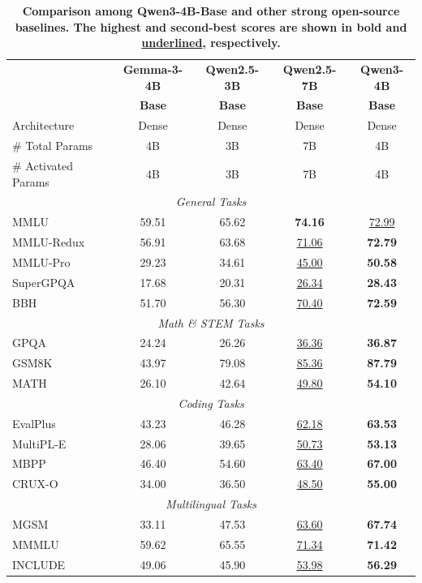 \begin{table}[tbp]
\centering
\caption{\textbf{Comparison among Qwen3-4B-Base and other strong open-source baselines. The highest and second-best scores are shown in \textbf{bold} and \underline{underlined}, respectively.}}
\label{tab:base-4B}
\small %
\begin{tabular}{@{}lcccc@{}}
\toprule
 & \textbf{Gemma-3-4B} & \textbf{Qwen2.5-3B} & \textbf{Qwen2.5-7B} & \textbf{Qwen3-4B} \\
 & \textbf{Base} & \textbf{Base}& \textbf{Base}& \textbf{Base} \\
\midrule
Architecture & Dense & Dense & Dense & Dense\\
\# Total Params & 4B & 3B & 7B & 4B \\
\# Activated Params & 4B & 3B & 7B & 4B \\
\midrule
\multicolumn{5}{c}{\textit{General Tasks}} \\
\midrule
MMLU & 59.51 & 65.62 & \textbf{74.16} & \underline{72.99} \\
MMLU-Redux & 56.91 & 63.68 & \underline{71.06} & \textbf{72.79} \\
MMLU-Pro & 29.23 & 34.61 & \underline{45.00} & \textbf{50.58} \\
SuperGPQA & 17.68 & 20.31 & \underline{26.34} & \textbf{28.43} \\
BBH & 51.70 & 56.30 & \underline{70.40} & \textbf{72.59} \\
\midrule
\multicolumn{5}{c}{\textit{Math \& STEM Tasks}} \\
\midrule
GPQA & 24.24 & 26.26 & \underline{36.36} & \textbf{36.87} \\
GSM8K & 43.97 & 79.08 & \underline{85.36} & \textbf{87.79} \\
MATH & 26.10 & 42.64 & \underline{49.80} & \textbf{54.10} \\
\midrule
\multicolumn{5}{c}{\textit{Coding Tasks}} \\
\midrule
EvalPlus & 43.23 & 46.28 & \underline{62.18} & \textbf{63.53} \\
MultiPL-E & 28.06 & 39.65 & \underline{50.73} & \textbf{53.13} \\
MBPP & 46.40 & 54.60 & \underline{63.40} & \textbf{67.00} \\
CRUX-O & 34.00 & 36.50 & \underline{48.50} & \textbf{55.00} \\
\midrule
\multicolumn{5}{c}{\textit{Multilingual Tasks}} \\
\midrule
MGSM & 33.11 & 47.53 & \underline{63.60} & \textbf{67.74} \\
MMMLU & 59.62 & 65.55 & \underline{71.34} & \textbf{71.42} \\
INCLUDE & 49.06 & 45.90 & \underline{53.98} & \textbf{56.29} \\
\bottomrule
\end{tabular}
\end{table}



